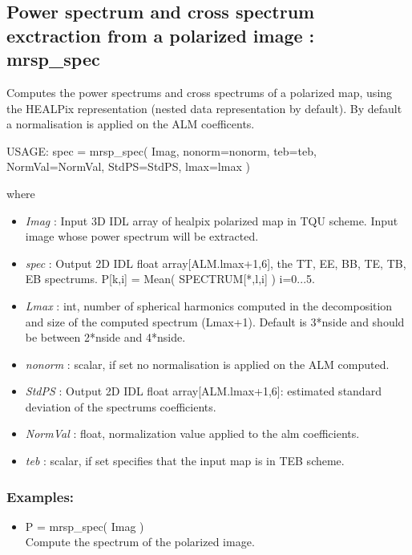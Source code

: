 \subsection{Power spectrum and cross spectrum exctraction from a polarized image : mrsp\_spec}
Computes the power spectrums and cross spectrums of a polarized map, using the HEALPix representation (nested data representation by default). 
By default a normalisation is applied on the ALM coefficents.
{\bf
\begin{center}
     USAGE: spec = mrsp\_spec( Imag, nonorm=nonorm, teb=teb, NormVal=NormVal, StdPS=StdPS, lmax=lmax )
\end{center}}
where
\begin{itemize}
\item {\em Imag} : Input 3D IDL array of healpix polarized map in TQU scheme. Input image whose power spectrum will be extracted.
\item {\em spec} : Output 2D IDL float array[ALM.lmax+1,6], the TT, EE, BB, TE, TB, EB spectrums. P[k,i] = Mean( SPECTRUM[*,l,i] ) \quad i=0...5.
\item {\em Lmax} : int, number of spherical harmonics computed in the decomposition and size of the computed spectrum (Lmax+1). Default is 3*nside and should be between 2*nside and 4*nside.
\item {\em nonorm} : scalar, if set no normalisation is applied on the ALM computed.
\item {\em StdPS} : Output 2D IDL float array[ALM.lmax+1,6]: estimated standard deviation of the spectrums coefficients.
\item {\em NormVal} : float, normalization value applied to the alm coefficients.
\item {\em teb} : scalar, if set specifies that the input map is in TEB scheme.
\end{itemize}

\subsubsection*{Examples:} 
\begin{itemize}
\item P = mrsp\_spec( Imag ) \\
Compute the spectrum of the polarized image.
\end{itemize}



